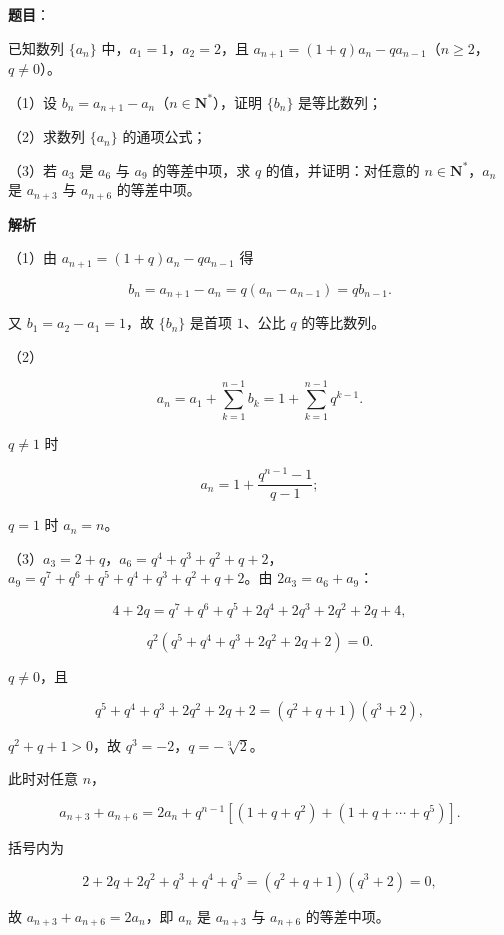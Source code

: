 \begin{answer}

\textbf{题目}：

已知数列 $\{a_n\}$ 中，$a_1=1$，$a_2=2$，且 $a_{n+1}=(1+q)a_n-qa_{n-1}$（$n\geqslant2$，$q\neq0$）。

（1）设 $b_n=a_{n+1}-a_n$（$n\in\mathbf N^*$），证明 $\{b_n\}$ 是等比数列；

（2）求数列 $\{a_n\}$ 的通项公式；

（3）若 $a_3$ 是 $a_6$ 与 $a_9$ 的等差中项，求 $q$ 的值，并证明：对任意的 $n\in\mathbf N^*$，$a_n$ 是 $a_{n+3}$ 与 $a_{n+6}$ 的等差中项。

\textbf{解析}

（1）由 $a_{n+1}=(1+q)a_n-qa_{n-1}$ 得

\nopagebreak[4]
\[b_n=a_{n+1}-a_n=q(a_n-a_{n-1})=qb_{n-1}.\]

又 $b_1=a_2-a_1=1$，故 $\{b_n\}$ 是首项 $1$、公比 $q$ 的等比数列。

（2）

\nopagebreak[4]
\[a_n=a_1+\sum_{k=1}^{n-1}b_k=1+\sum_{k=1}^{n-1}q^{k-1}.\]

$q\neq1$ 时

\nopagebreak[4]
\[a_n=1+\frac{q^{n-1}-1}{q-1};\]

$q=1$ 时 $a_n=n$。

（3）$a_3=2+q$，$a_6=q^4+q^3+q^2+q+2$，$a_9=q^7+q^6+q^5+q^4+q^3+q^2+q+2$。由 $2a_3=a_6+a_9$：

\nopagebreak[4]
\[4+2q=q^7+q^6+q^5+2q^4+2q^3+2q^2+2q+4,\]

\nopagebreak[4]
\[q^2\left(q^5+q^4+q^3+2q^2+2q+2\right)=0.\]

$q\neq0$，且

\nopagebreak[4]
\[q^5+q^4+q^3+2q^2+2q+2=(q^2+q+1)(q^3+2),\]

$q^2+q+1>0$，故 $q^3=-2$，$q=-\sqrt[3]{2}$。

此时对任意 $n$，

\nopagebreak[4]
\[a_{n+3}+a_{n+6}=2a_n+q^{n-1}\left[(1+q+q^2)+(1+q+\cdots+q^5)\right].\]

括号内为

\nopagebreak[4]
\[2+2q+2q^2+q^3+q^4+q^5=(q^2+q+1)(q^3+2)=0,\]

故 $a_{n+3}+a_{n+6}=2a_n$，即 $a_n$ 是 $a_{n+3}$ 与 $a_{n+6}$ 的等差中项。


\end{answer}
